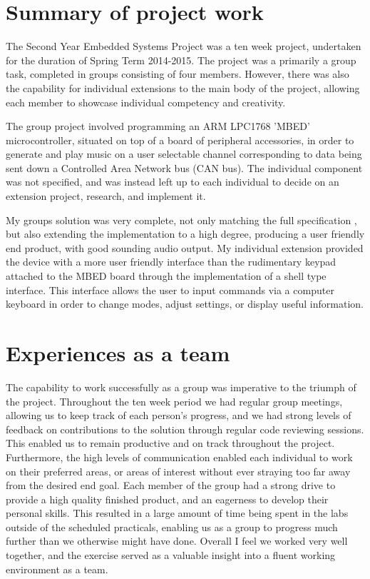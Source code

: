 \section{Summary of project work}
The Second Year Embedded Systems Project was a ten week project, undertaken 
for the duration of Spring Term 2014-2015. The project was a primarily a 
group task, completed in groups consisting of four members. However, there 
was also the capability for individual extensions to the main body of the 
project, allowing each member to showcase individual competency and creativity.
\par\bigskip\noindent
The group project involved programming an ARM LPC1768 'MBED' microcontroller, 
situated on top of a board of peripheral accessories, in order to 
generate and play music on a user selectable channel corresponding to data 
being sent down a Controlled Area Network bus (CAN bus). The individual 
component was not specified, and was instead left up to each individual to 
decide on an extension project, research, and implement it. 
\par\bigskip\noindent
My groups solution was very complete, not only matching the full specification
, but also extending the implementation to a high degree, producing a user 
friendly end product, with good sounding audio output. 
My individual extension provided the device with a more user friendly 
interface than the 
rudimentary keypad attached to the MBED board through the implementation of a 
shell type interface. This interface allows the user to input 
commands via a computer keyboard in order to change modes, adjust settings,
or display useful information.

 
\section{Experiences as a team}
The capability to work successfully as a group was imperative to the triumph of
the project. Throughout the ten week period we had regular group meetings, 
allowing us to keep track of each person's progress, and we had strong levels 
of feedback on contributions to the solution through regular code reviewing 
sessions. This enabled us to remain productive and on track throughout the 
project. 
Furthermore, the high levels of communication enabled each individual to work 
on their preferred areas, or areas of interest without ever straying too far 
away from the desired end goal. 
Each member of the group had a strong drive to 
provide a high quality finished product, and an eagerness to develop their 
personal skills. 
This resulted in a large amount of time being spent in the 
labs outside of the scheduled practicals, enabling us as a group to progress 
much further than we otherwise might have done. Overall I feel we worked very 
well together, and the exercise served as a valuable insight into a fluent 
working environment as a team. 

